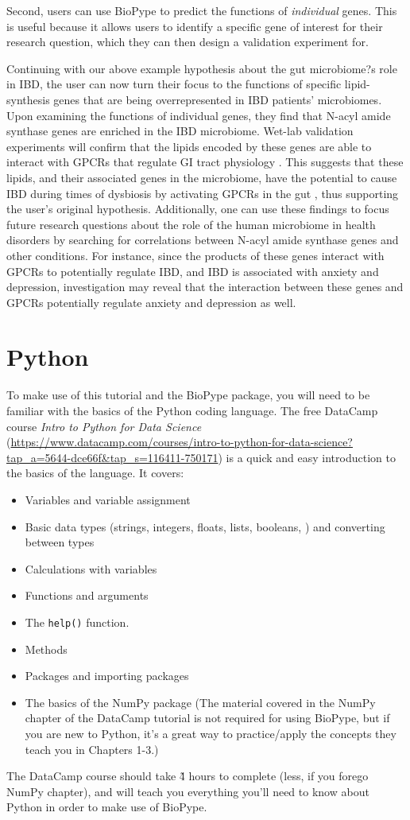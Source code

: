 {Second, users can use BioPype to predict the functions of \textit{individual} genes. This is useful because it allows users to identify a specific gene of interest for their research question, which they can then design a validation experiment for. 

Continuing with our above example hypothesis about the gut microbiome?s role in IBD, the user can now turn their focus to the functions of specific lipid-synthesis genes that are being overrepresented in IBD patients' microbiomes. Upon examining the functions of individual genes, they find that N-acyl amide synthase genes are enriched in the IBD microbiome. Wet-lab validation experiments will confirm that the lipids encoded by these genes are able to interact with GPCRs that regulate GI tract physiology \citep{Cohen2017}. This suggests that these lipids, and their associated genes in the microbiome, have the potential to cause IBD during times of dysbiosis by activating GPCRs in the gut \citep{Cohen2017}, thus supporting the user's original hypothesis. Additionally, one can use these findings to focus future research questions about the role of the human microbiome in health disorders by searching for correlations between N-acyl amide synthase genes and other conditions. For instance, since the products of these genes interact with GPCRs to potentially regulate IBD, and IBD is associated with anxiety and depression, investigation may reveal that the interaction between these genes and GPCRs potentially regulate anxiety and depression as well.

%
\section{Python}
To make use of this tutorial and the BioPype package, you will need to be familiar with the basics of the Python coding language. The free DataCamp course \textit{Intro to Python for Data Science} (\url{https://www.datacamp.com/courses/intro-to-python-for-data-science?tap_a=5644-dce66f&tap_s=116411-750171}) is a quick and easy introduction to the basics of the language. It covers:
%
\begin{itemize}
\item Variables and variable assignment
\item Basic data types (strings, integers, floats, lists, booleans, ) and converting between types
\item Calculations with variables
\item Functions and arguments
\item The \verb|help()| function.
\item Methods
\item Packages and importing packages
\item The basics of the NumPy package (The material covered in the NumPy chapter of the DataCamp tutorial is not required for using BioPype, but if you are new to Python,  it's a great way to practice/apply the concepts they teach you in Chapters 1-3.)
\end{itemize}
%
The DataCamp course should take \~4 hours to complete (less, if you forego NumPy chapter), and will teach you everything you'll need to know about Python in order to make use of BioPype. 

}
